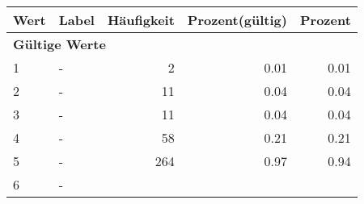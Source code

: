      \begin{longtable}{lXrrr}
     \toprule
     \textbf{Wert} & \textbf{Label} & \textbf{Häufigkeit} & \textbf{Prozent(gültig)} & \textbf{Prozent} \\
     \endhead
     \midrule
     \multicolumn{5}{l}{\textbf{Gültige Werte}}\\

     1 &
     \multicolumn{1}{X}{ -  } &


       \num{2} &
       \num[round-mode=places,round-precision=2]{0.01} &
         \num[round-mode=places,round-precision=2]{0.01} \\

     2 &
     \multicolumn{1}{X}{ -  } &


       \num{11} &
       \num[round-mode=places,round-precision=2]{0.04} &
         \num[round-mode=places,round-precision=2]{0.04} \\

     3 &
     \multicolumn{1}{X}{ -  } &


       \num{11} &
       \num[round-mode=places,round-precision=2]{0.04} &
         \num[round-mode=places,round-precision=2]{0.04} \\

     4 &
     \multicolumn{1}{X}{ -  } &


       \num{58} &
       \num[round-mode=places,round-precision=2]{0.21} &
         \num[round-mode=places,round-precision=2]{0.21} \\

     5 &
     \multicolumn{1}{X}{ -  } &


       \num{264} &
       \num[round-mode=places,round-precision=2]{0.97} &
         \num[round-mode=places,round-precision=2]{0.94} \\

     6 &
     \multicolumn{1}{X}{ -  } &



\end{longtable}
